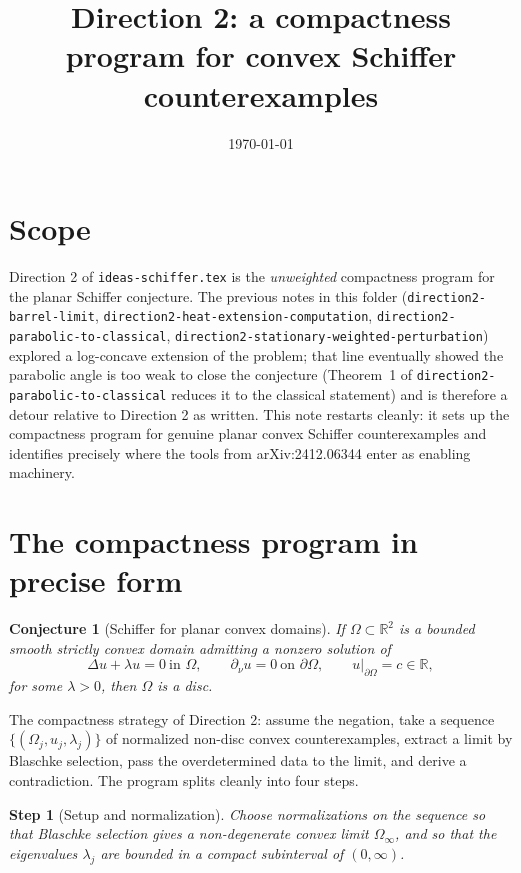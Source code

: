 \documentclass[11pt]{article}
\title{Direction 2: a compactness program for convex Schiffer counterexamples}
\author{}
\date{\today}
\newcommand{\R}{\mathbb{R}}
\newcommand{\Om}{\Omega}
\newcommand{\1}{\mathbf 1}
\newcommand{\nor}{\partial_\nu}
\newtheorem{conj}[lem]{Conjecture}
\newtheorem{step}[lem]{Step}
\begin{document}
\maketitle

\section*{Scope}

Direction 2 of \texttt{ideas-schiffer.tex} is the \emph{unweighted}
compactness program for the planar Schiffer conjecture. The previous
notes in this folder (\texttt{direction2-barrel-limit},
\texttt{direction2-heat-extension-computation},
\texttt{direction2-parabolic-to-classical},
\texttt{direction2-stationary-weighted-perturbation}) explored a
log-concave extension of the problem; that line eventually showed the
parabolic angle is too weak to close the conjecture
(Theorem~1 of \texttt{direction2-parabolic-to-classical} reduces it
to the classical statement) and is therefore a detour relative to
Direction 2 as written. This note restarts cleanly: it sets up the
compactness program for genuine planar convex Schiffer
counterexamples and identifies precisely where the tools from
arXiv:2412.06344 enter as enabling machinery.

\section{The compactness program in precise form}

\begin{conj}[Schiffer for planar convex domains]\label{conj:schiffer}
If $\Om\subset\R^2$ is a bounded smooth strictly convex domain
admitting a nonzero solution of
\begin{equation}\label{eq:schiffer}
    \Delta u+\lambda u=0\ \text{in }\Om,\qquad
    \nor u=0\ \text{on }\partial\Om,\qquad
    u|_{\partial\Om}=c\in\R,
\end{equation}
for some $\lambda>0$, then $\Om$ is a disc.
\end{conj}

The compactness strategy of Direction 2: assume the negation, take a
sequence $\{(\Om_j,u_j,\lambda_j)\}$ of normalized non-disc convex
counterexamples, extract a limit by Blaschke selection, pass the
overdetermined data to the limit, and derive a contradiction. The
program splits cleanly into four steps.

\begin{step}[Setup and normalization]\label{step:normalize}
Choose normalizations on the sequence so that Blaschke selection
gives a non-degenerate convex limit $\Om_\infty$, and so that the
eigenvalues $\lambda_j$ are bounded in a compact subinterval of
$(0,\infty)$.
\end{step}
\end{document}
